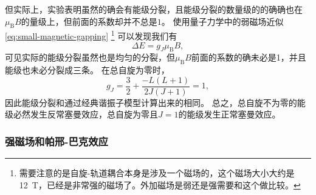 但实际上，实验表明虽然的确会有能级分裂，且能级分裂的数量级的的确确也在$\mu_\text{B} B$的量级上，但前面的系数却并不总是$1$。
使用量子力学中的弱磁场近似\eqref{eq:small-magnetic-gapping}%
\footnote{
    需要注意的是自旋-轨道耦合本身是涉及一个磁场的，这个磁场大小大约是\SI{12}{T}，已经是非常强的磁场了。外加磁场是弱还是强需要和这个做比较。
}%
可以发现我们有
\begin{equation}
    \Delta E = g_J \mu_\text{B} B,
\end{equation}
可见实际的能级分裂虽然也是均匀的分裂，但$\mu_\text{B} B$前面的系数的确未必是1，并且能级也未必分裂成三条。
在总自旋为零时，
\[
    g_J = \frac{3}{2} + \frac{-L(L+1)}{2J(J+1)} = 1,
\]
因此能级分裂和通过经典谐振子模型计算出来的相同。
总之，总自旋不为零的能级必然发生反常塞曼效应，总自旋为零且$J=1$的能级发生正常塞曼效应。

\subsubsection{强磁场和帕邢-巴克效应}

